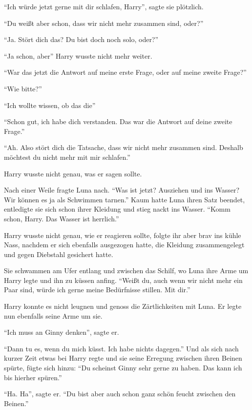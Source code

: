 \begin{abAchtzehn}

\enquote{Ich würde jetzt gerne mit dir schlafen, Harry}, sagte sie plötzlich.

\enquote{Du weißt aber schon, dass wir nicht mehr zusammen sind, oder?}

\enquote{Ja. Stört dich das? Du bist doch noch solo, oder?}

\enquote{Ja schon, aber\abs} Harry wusste nicht mehr weiter.

\enquote{War das jetzt die Antwort auf meine erste Frage, oder auf meine zweite Frage?}

\enquote{Wie bitte?}

\enquote{Ich wollte wissen, ob das die\abs}

\enquote{Schon gut, ich habe dich verstanden. \gst Das war die Antwort auf deine zweite Frage.}

\enquote{Ah. Also stört dich die Tatsache, dass wir nicht mehr zusammen sind. Deshalb möchtest du nicht mehr mit mir schlafen.}

Harry wusste nicht genau, was er sagen sollte.

Nach einer Weile fragte Luna nach. \enquote{Was ist jetzt? Ausziehen und ins Wasser? Wir können es ja als Schwimmen tarnen.} Kaum hatte Luna ihren Satz beendet, entledigte sie sich schon ihrer Kleidung und stieg nackt ins Wasser. \enquote{Komm schon, Harry. Das Wasser ist herrlich.}

Harry wusste nicht genau, wie er reagieren sollte, folgte ihr aber brav ins kühle Nass, nachdem er sich ebenfalls ausgezogen hatte, die Kleidung zusammengelegt und gegen Diebstahl gesichert hatte.

Sie schwammen am Ufer entlang und zwischen das Schilf, wo Luna ihre Arme um Harry legte und ihn zu küssen anfing. \enquote{Weißt du, auch wenn wir nicht mehr ein Paar sind, würde ich gerne meine Bedürfnisse stillen. Mit dir.}

Harry konnte es nicht leugnen und genoss die Zärtlichkeiten mit Luna. Er legte nun ebenfalls seine Arme um sie.

\enquote{Ich muss an Ginny denken}, sagte er.

\enquote{Dann tu es, wenn du mich küsst. Ich habe nichts dagegen.} Und als sich nach kurzer Zeit etwas bei Harry regte und sie seine Erregung zwischen ihren Beinen spürte, fügte sich hinzu: \enquote{Du scheinst Ginny sehr gerne zu haben. Das kann ich bis hierher spüren.}

\enquote{Ha. Ha}, sagte er. \enquote{Du bist aber auch schon ganz schön feucht zwischen den Beinen.}


\end{abAchtzehn}
